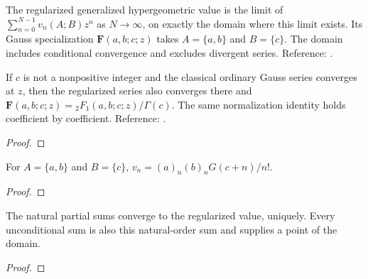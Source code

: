 \begin{definition}
\label{def:regularized-hypergeometric}
\leanok
The regularized generalized hypergeometric value is the limit of
$\sum_{n=0}^{N-1}v_n(A;B)z^n$ as $N\to\infty$, on exactly the domain where this
limit exists. Its Gauss specialization $\mathbf F(a,b;c;z)$ takes
$A=\{a,b\}$ and $B=\{c\}$. The domain includes conditional convergence and excludes divergent series.
Reference: \cite[15.2.2, 16.2]{dlmf}.
\end{definition}

\begin{theorem}
\label{thm:regularized-gauss}
\leanok
If $c$ is not a nonpositive integer and the classical ordinary Gauss series
converges at $z$, then the regularized series also converges there and
$\mathbf F(a,b;c;z)={}_2F_1(a,b;c;z)/\Gamma(c)$.
The same normalization identity holds coefficient by coefficient.
Reference: \cite[15.2.2]{dlmf}.
\end{theorem}
\begin{proof}
\leanok
\end{proof}

\begin{supporting}

\begin{theorem}
\label{thm:regularized-hypergeometric-coefficients}
\leanok
For $A=\{a,b\}$ and $B=\{c\}$,
$ v_n=(a)_n(b)_nG(c+n)/n!$.
\end{theorem}
\begin{proof}
\leanok
\end{proof}

\begin{theorem}
\label{thm:regularized-hypergeometric}
\leanok
The natural partial sums converge to the regularized value, uniquely. Every
unconditional sum is also this natural-order sum and supplies a point of the domain.
\end{theorem}
\begin{proof}
\leanok
\end{proof}

\end{supporting}


